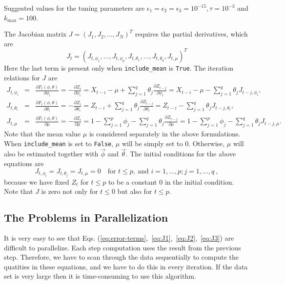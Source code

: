 \documentclass[english,10pt]{llncs}
\begin{document}
Suggested values for the tuning parameters are $\epsilon_1 = \epsilon_2 =
\epsilon_3 = 10^{-15}, \tau = 10^{-3}$ and $k_{\max} = 100$.

The Jacobian matrix $J = {(J_{1}, J_{2}, \ldots, J_N)}^T$ requires the
partial derivatives, which are
\begin{equation}
J_t = {(J_{t, \phi_1}, \ldots, J_{t,\phi_p}, J_{t,\theta_1}, \ldots,
  J_{t,\theta_q}, J_{t,\mu})}^T
\end{equation}
Here the last term is present only when \texttt{include\_mean} is
\texttt{True}.
The iteration relations for $J$ are
\begin{eqnarray}
  J_{t, \phi_i} &=& \frac{\partial F_t(\phi,\theta)}{\partial \phi_i} =
  -\frac{\partial Z_t}{\partial \phi_i} = X_{t-i}-\mu + \sum_{j=1}^q
  \theta_j \frac{\partial Z_{t - j}}{\partial \phi_i} = X_{t-i}-\mu - \sum_{j=1}^q
  \theta_j J_{t-j,\phi_i}, \label{eq:J1}\\
  J_{t, \theta_i}&=&\frac{\partial F_t(\phi,\theta)}{\partial \theta_i} =
  -\frac{\partial Z_t}{\partial \theta_i} = Z_{t-i} + \sum_{j =1}^q
  \theta_j \frac{\partial Z_{t - j}}{\partial \theta_i} = Z_{t-i} -
  \sum_{j=1}^q \theta_j J_{t-j,\theta_i}, \label{eq:J2}\\
  J_{t, \mu} &=&\frac{\partial F_t(\phi,\theta)}{\partial \mu} =
  -\frac{\partial Z_t}{\partial \mu} = 1 -
  \sum_{j=1}^p \phi_j - \sum_{j=1}^q \theta_j \frac{\partial
    Z_{t-j}}{\partial \mu} = 1 - \sum_{j=1}^p \phi_j - \sum_{j=1}^q
  \theta_j J_{t-j,\mu}. \label{eq:J3}
\end{eqnarray}
Note that the mean value $\mu$ is considered separately in the above
formulations. When \texttt{include\_mean} is set to \texttt{False},
$\mu$ will be simply set to 0. Otherwise, $\mu$ will also be estimated
together with $\vec{\phi}$ and $\vec{\theta}$. The initial conditions
for the above equations are
\begin{equation}
J_{t,\phi_i} = J_{t,\theta_j} = J_{t,\mu} = 0 \quad \mbox{for }
t \leq p,\ \mbox{and }i=1,\dots,p; j = 1, \dots, q\ ,
\end{equation}
because we have fixed $Z_t$ for $t\leq p$ to be a constant $0$ in the
initial condition. Note that $J$ is zero not only for $t\leq 0$ but
also for $t\leq p$.

\subsection{The Problems in Parallelization}

It is very easy to see that Eqs.
(\ref{eq:error-terms},~\ref{eq:J1},~\ref{eq:J2},~\ref{eq:J3}) are
difficult to parallelize. Each step computation uses the result from
the previous step. Therefore, we have to scan through the data
sequentially to compute the quatities in these equations, and we have
to do this in every iteration. If the data set is very large then it
is time-consuming to use this algorithm. 
\end{document}
